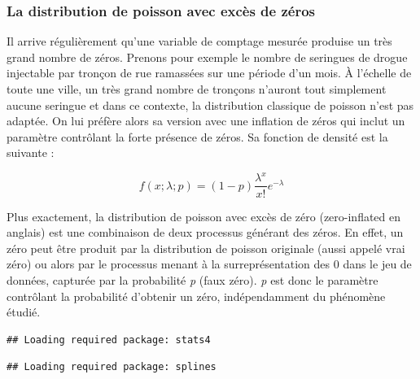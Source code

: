 \documentclass[
  11pt,
  french,
]{book}
\begin{document}
\hypertarget{la-distribution-de-poisson-avec-excuxe8s-de-zuxe9ros}{%
\subsubsection{La distribution de poisson avec excès de zéros}\label{la-distribution-de-poisson-avec-excuxe8s-de-zuxe9ros}}

Il arrive régulièrement qu'une variable de comptage mesurée produise un très grand nombre de zéros. Prenons pour exemple le nombre de seringues de drogue injectable par tronçon de rue ramassées sur une période d'un mois. À l'échelle de toute une ville, un très grand nombre de tronçons n'auront tout simplement aucune seringue et dans ce contexte, la distribution classique de poisson n'est pas adaptée. On lui préfère alors sa version avec une inflation de zéros qui inclut un paramètre contrôlant la forte présence de zéros. Sa fonction de densité est la suivante :

\begin{equation}f(x ; \lambda; p)=(1-p)\frac{\lambda^{x}}{x !} e^{-\lambda}
\label{eq:poissonzi}
\end{equation}

Plus exactement, la distribution de poisson avec excès de zéro (zero-inflated en anglais) est une combinaison de deux processus générant des zéros. En effet, un zéro peut être produit par la distribution de poisson originale (aussi appelé vrai zéro) ou alors par le processus menant à la surreprésentation des 0 dans le jeu de données, capturée par la probabilité \emph{p} (faux zéro). \emph{p} est donc le paramètre contrôlant la probabilité d'obtenir un zéro, indépendamment du phénomène étudié.

\begin{verbatim}
## Loading required package: stats4
\end{verbatim}

\begin{verbatim}
## Loading required package: splines
\end{verbatim}
\end{document}
